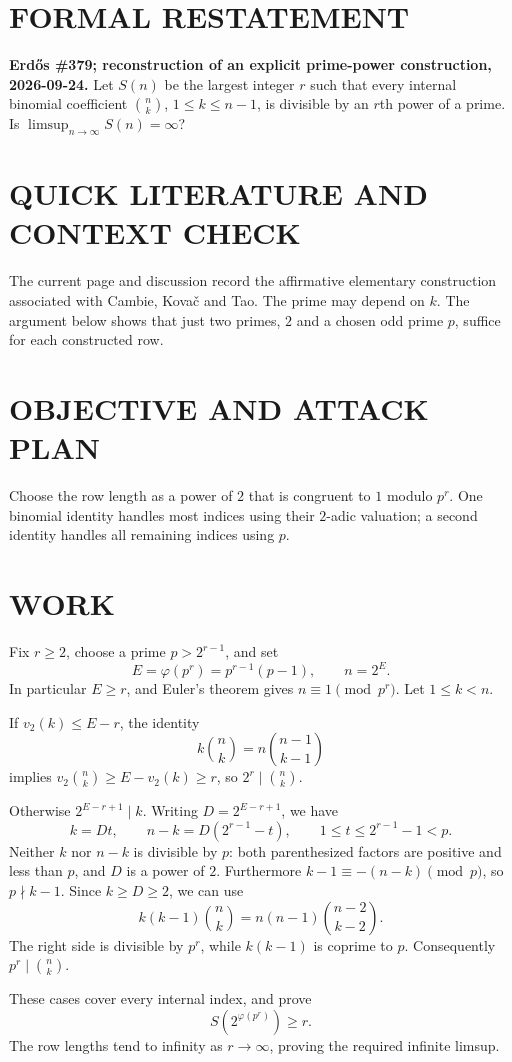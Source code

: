 \section{FORMAL RESTATEMENT}
\textbf{Erd\H{o}s \#379; reconstruction of an explicit prime-power construction, 2026-09-24.}
Let $S(n)$ be the largest integer $r$ such that every internal binomial coefficient $\binom nk$, $1\leq k\leq n-1$, is divisible by an $r$th power of a prime. Is $\limsup_{n\to\infty}S(n)=\infty$?

\section{QUICK LITERATURE AND CONTEXT CHECK}
The current page and discussion record the affirmative elementary construction associated with Cambie, Kova\v c and Tao. The prime may depend on $k$. The argument below shows that just two primes, $2$ and a chosen odd prime $p$, suffice for each constructed row.

\section{OBJECTIVE AND ATTACK PLAN}
Choose the row length as a power of $2$ that is congruent to $1$ modulo $p^r$. One binomial identity handles most indices using their $2$-adic valuation; a second identity handles all remaining indices using $p$.

\section{WORK}
Fix $r\geq2$, choose a prime $p>2^{r-1}$, and set
\[
E=\varphi(p^r)=p^{r-1}(p-1),\qquad n=2^E.
\]
In particular $E\geq r$, and Euler's theorem gives $n\equiv1\pmod {p^r}$. Let $1\leq k<n$.

If $v_2(k)\leq E-r$, the identity
\[
k\binom nk=n\binom{n-1}{k-1}
\]
implies $v_2\binom nk\geq E-v_2(k)\geq r$, so $2^r\mid\binom nk$.

Otherwise $2^{E-r+1}\mid k$. Writing $D=2^{E-r+1}$, we have
\[
k=Dt,\qquad n-k=D(2^{r-1}-t),\qquad1\leq t\leq2^{r-1}-1<p.
\]
Neither $k$ nor $n-k$ is divisible by $p$: both parenthesized factors are positive and less than $p$, and $D$ is a power of $2$. Furthermore $k-1\equiv-(n-k)\pmod p$, so $p\nmid k-1$. Since $k\geq D\geq2$, we can use
\[
k(k-1)\binom nk=n(n-1)\binom{n-2}{k-2}.
\]
The right side is divisible by $p^r$, while $k(k-1)$ is coprime to $p$. Consequently $p^r\mid\binom nk$.

These cases cover every internal index, and prove
\[
S\!\left(2^{\varphi(p^r)}\right)\geq r.                         \tag{1}
\]
The row lengths tend to infinity as $r\to\infty$, proving the required infinite limsup.

